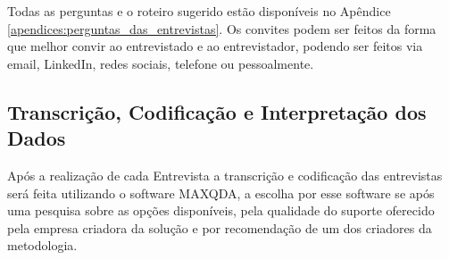 Todas as perguntas e o roteiro sugerido estão disponíveis no Apêndice \ref{apendices:perguntas_das_entrevistas}. Os convites podem ser feitos da forma que melhor convir ao entrevistado e ao entrevistador, podendo ser feitos via email, LinkedIn, redes sociais, telefone ou pessoalmente.

\subsection{Transcrição, Codificação e Interpretação dos Dados}
\label{subsection:codificacao_e_interpretacao_dos_dados}

Após a realização de cada Entrevista a transcrição e codificação das entrevistas será feita utilizando o software MAXQDA, a escolha por esse software se após uma pesquisa sobre as opções disponíveis, pela qualidade do suporte oferecido pela empresa criadora da solução e por recomendação de um dos criadores da metodologia.
